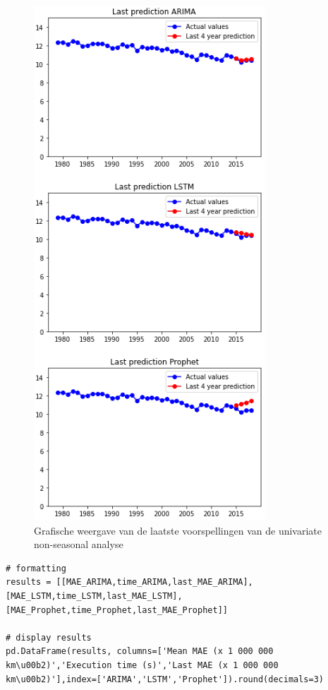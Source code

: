 \begin{figure}
    \centering
    \caption{Grafische weergave van de laatste voorspellingen van de univariate non-seasonal analyse}
    \label{fig:uvnsresultgraph}
    \includegraphics[width=0.7\linewidth]{uv_ns_result_graph}
\end{figure}



\begin{verbatim}
# formatting
results = [[MAE_ARIMA,time_ARIMA,last_MAE_ARIMA],[MAE_LSTM,time_LSTM,last_MAE_LSTM],[MAE_Prophet,time_Prophet,last_MAE_Prophet]]

# display results
pd.DataFrame(results, columns=['Mean MAE (x 1 000 000 km\u00b2)','Execution time (s)','Last MAE (x 1 000 000 km\u00b2)'],index=['ARIMA','LSTM','Prophet']).round(decimals=3)

\end{verbatim}

